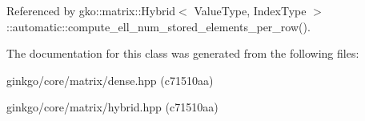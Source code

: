 Referenced by gko\+::matrix\+::\+Hybrid$<$ Value\+Type, Index\+Type $>$\+::automatic\+::compute\+\_\+ell\+\_\+num\+\_\+stored\+\_\+elements\+\_\+per\+\_\+row().



The documentation for this class was generated from the following files\+:\begin{DoxyCompactItemize}
\item 
ginkgo/core/matrix/dense.\+hpp (c71510aa)\item 
ginkgo/core/matrix/hybrid.\+hpp (c71510aa)\end{DoxyCompactItemize}
